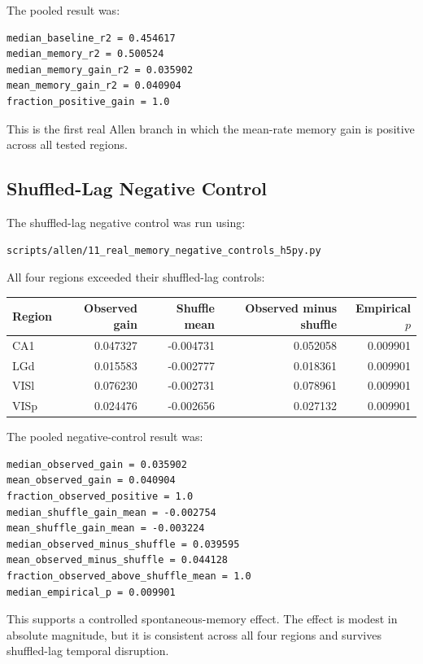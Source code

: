 The pooled result was:

\begin{verbatim}
median_baseline_r2 = 0.454617
median_memory_r2 = 0.500524
median_memory_gain_r2 = 0.035902
mean_memory_gain_r2 = 0.040904
fraction_positive_gain = 1.0
\end{verbatim}

This is the first real Allen branch in which the mean-rate memory gain is positive across all tested regions.

\subsection{Shuffled-Lag Negative Control}

The shuffled-lag negative control was run using:

\begin{verbatim}
scripts/allen/11_real_memory_negative_controls_h5py.py
\end{verbatim}

All four regions exceeded their shuffled-lag controls:

\begin{center}
\begin{tabular}{lrrrr}
\hline
Region & Observed gain & Shuffle mean & Observed minus shuffle & Empirical \(p\) \\
\hline
CA1 & 0.047327 & -0.004731 & 0.052058 & 0.009901 \\
LGd & 0.015583 & -0.002777 & 0.018361 & 0.009901 \\
VISl & 0.076230 & -0.002731 & 0.078961 & 0.009901 \\
VISp & 0.024476 & -0.002656 & 0.027132 & 0.009901 \\
\hline
\end{tabular}
\end{center}

The pooled negative-control result was:

\begin{verbatim}
median_observed_gain = 0.035902
mean_observed_gain = 0.040904
fraction_observed_positive = 1.0
median_shuffle_gain_mean = -0.002754
mean_shuffle_gain_mean = -0.003224
median_observed_minus_shuffle = 0.039595
mean_observed_minus_shuffle = 0.044128
fraction_observed_above_shuffle_mean = 1.0
median_empirical_p = 0.009901
\end{verbatim}

This supports a controlled spontaneous-memory effect. The effect is modest in absolute magnitude, but it is consistent across all four regions and survives shuffled-lag temporal disruption.

